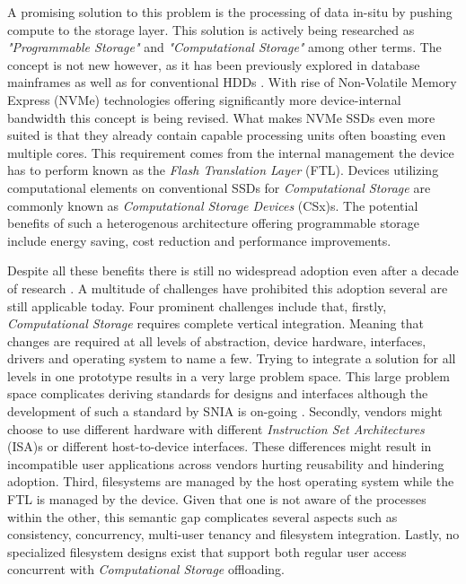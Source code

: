 A promising solution to this problem is the processing of data in-situ by
pushing compute to the storage layer. This solution is actively being researched
as \textit{"Programmable Storage"} and \textit{"Computational Storage"} among
other terms. The concept is not new however, as it has been previously
explored in database mainframes \cite{database-computer} as well as for
conventional HDDs \cite{active-disk-pillar, active-disks-tech,
intelligent-disk}. With rise of Non-Volatile Memory Express (NVMe) technologies
offering significantly more device-internal bandwidth this concept is being
revised. What makes NVMe SSDs even more suited is that they already contain
capable processing units often boasting even multiple cores. This requirement
comes from the internal management the device has to perform known as the
\textit{Flash Translation Layer} (FTL). Devices utilizing computational elements
on conventional SSDs for \textit{Computational Storage} are commonly known as
\textit{Computational Storage Devices} (CSx)s. The potential benefits of such a
heterogenous architecture offering programmable storage include energy saving,
cost reduction and performance improvements.


Despite all these benefits there is still no widespread adoption even after a
decade of research \cite{lukken2021past}. A multitude of challenges
have prohibited this adoption several are still applicable today. Four
prominent challenges include that, firstly, \textit{Computational Storage}
requires complete vertical integration. Meaning that changes are required at all
levels of abstraction, device hardware, interfaces, drivers and operating system
to name a few. Trying to integrate a solution for all levels in one prototype
results in a very large problem space. This large problem space complicates
deriving standards for designs and interfaces although the development of such a
standard by SNIA is on-going \cite{snia-model}. Secondly, vendors might choose
to use different hardware with different
\textit{Instruction Set Architectures} (ISA)s or different host-to-device
interfaces. These differences might result in incompatible user applications
across vendors hurting reusability and hindering adoption. Third, filesystems
are managed by the host operating system while the FTL is
managed by the device. Given that one is not aware of the processes within the
other, this semantic gap complicates several aspects such as consistency,
concurrency, multi-user tenancy and filesystem integration. Lastly, no
specialized filesystem designs exist that support both regular user access
concurrent with \textit{Computational Storage} offloading.


